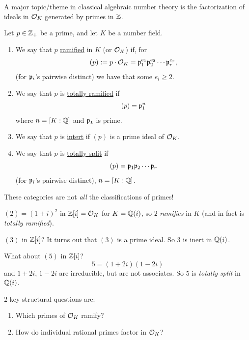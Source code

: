 A major topic/theme in classical algebraic number theory is the factorization of ideals in $\mathcal{O}_K$ generated by primes in $\mathbb Z$.
\begin{definition}
    Let $p\in\mathbb Z_+$ be a prime, and let $K$ be a number field.

    \begin{enumerate}[1)]
        \item We say that $p$ \ul{ramified} in $K$ (or $\mathcal{O}_K$) if, for
              \[(p) := p\cdot\mathcal{O}_K = \mathfrak{p}_1^{e_1}\mathfrak{p}_2^{e_2}\cdots \mathfrak{p}_r^{e_r},\]
              (for $\mathfrak{p}_i$'s pairwise distinct) we have that some $e_i\geq 2$.
        \item We say that $p$ is \ul{totally ramified} if
              \[(p) = \mathfrak{p}_1^n\]
              where $n = [K : \mathbb Q]$ and $\mathfrak{p_1}$ is prime.
        \item We say that $p$ is \ul{intert} if $(p)$ is a prime ideal of $\mathcal{O}_K$.
        \item We say that $p$ is \ul{totally split} if
              \[(p) = \mathfrak{p}_1 \mathfrak{p}_2\cdots \mathfrak{p}_r\]
              (for $\mathfrak{p}_i$'s pairwise distinct), $n = [K : \mathbb Q]$.
    \end{enumerate}
\end{definition}
\begin{remark}
    These categories are not \emph{all} the classifications of primes!
\end{remark}
\begin{example}
    $(2) = (1 + i)^2$ in $\mathbb Z[i] = \mathcal{O}_K$ for $K = \mathbb Q(i)$, so $2$ \emph{ramifies} in $K$ (and in fact is \emph{totally ramified}).
\end{example}
\begin{example}
    $(3)$ in $\mathbb Z[i]$? It turns out that $(3)$ is a prime ideal. So $3$ is inert in $\mathbb Q(i)$.
\end{example}
\begin{example}
    What about $(5)$ in $\mathbb Z[i]$?
    \[5 = (1 + 2i)(1 - 2i)\]
    and $1 + 2i$, $1 - 2i$ are irreducible, but are not associates. So $5$ is \emph{totally split} in $\mathbb Q(i)$.
\end{example}
$2$ key structural questions are:
\begin{enumerate}[1)]
    \item Which primes of $\mathcal{O}_K$ ramify?
    \item How do individual rational primes factor in $\mathcal{O}_K$?
\end{enumerate}


